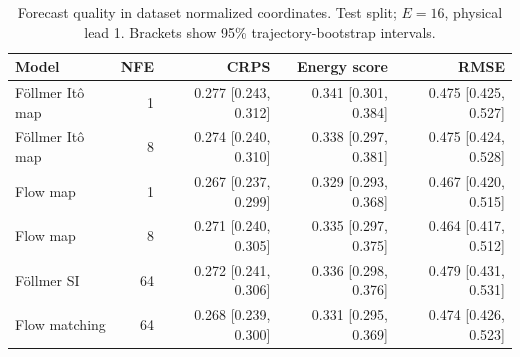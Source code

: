 \begin{table}[t]
\centering
\small
\setlength{\tabcolsep}{3pt}
\caption{Forecast quality in dataset normalized coordinates. Test split; $E=16$, physical lead 1. Brackets show 95\% trajectory-bootstrap intervals.}
\label{tab:map-quality}
\begin{tabular}{lrrrr}
\toprule
Model & NFE & CRPS & Energy score & RMSE \\
\midrule
Föllmer Itô map & 1 & 0.277 [0.243, 0.312] & 0.341 [0.301, 0.384] & 0.475 [0.425, 0.527] \\
Föllmer Itô map & 8 & 0.274 [0.240, 0.310] & 0.338 [0.297, 0.381] & 0.475 [0.424, 0.528] \\
\addlinespace
Flow map & 1 & 0.267 [0.237, 0.299] & 0.329 [0.293, 0.368] & 0.467 [0.420, 0.515] \\
Flow map & 8 & 0.271 [0.240, 0.305] & 0.335 [0.297, 0.375] & 0.464 [0.417, 0.512] \\
\addlinespace
Föllmer SI & 64 & 0.272 [0.241, 0.306] & 0.336 [0.298, 0.376] & 0.479 [0.431, 0.531] \\
\addlinespace
Flow matching & 64 & 0.268 [0.239, 0.300] & 0.331 [0.295, 0.369] & 0.474 [0.426, 0.523] \\
\bottomrule
\end{tabular}
\end{table}
